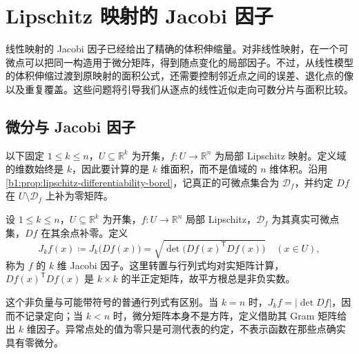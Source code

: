\section{Lipschitz 映射的 Jacobi 因子}
\label{b1:sec:1702}

线性映射的 Jacobi 因子已经给出了精确的体积伸缩量。对非线性映射，在一个可微点可以把同一构造用于微分矩阵，得到随点变化的局部因子。不过，从线性模型的体积伸缩过渡到原映射的面积公式，还需要控制邻近点之间的误差、退化点的像以及重复覆盖。这些问题将引导我们从逐点的线性近似走向可数分片与面积比较。


\subsection{微分与 Jacobi 因子}
\label{b1:subsec:170201}

以下固定 \(1\leq k\leq n\)，\(U\subseteq\mathbb R^k\) 为开集，\(f:U\to\mathbb R^n\) 为局部 Lipschitz 映射。定义域的维数始终是 \(k\)，因此要计算的是 \(k\) 维面积，而不是值域的 \(n\) 维体积。沿用\cref{b1:prop:lipschitz-differentiability-borel}，记真正的可微点集合为 \(\mathcal D_f\)，并约定 \(Df\) 在 \(U\setminus\mathcal D_f\) 上补为零矩阵。

\begin{definition}
\label{b1:def:lipschitz-jacobian}
设 \(1\le k\le n\)，\(U\subseteq\mathbb R^k\) 为开集，\(f:U\to\mathbb R^n\) 局部 Lipschitz，\(\mathcal D_f\) 为其真实可微点集，\(Df\) 在其余点补零。定义
\[
J_k f(x)\coloneqq J_k\bigl(Df(x)\bigr)
=\sqrt{\det\bigl(Df(x)^{\mathsf T}Df(x)\bigr)}
\quad(x\in U),
\]
称为 \(f\) 的 \(k\) 维 Jacobi 因子。这里转置与行列式均对实矩阵计算，\(Df(x)^{\mathsf T}Df(x)\) 是 \(k\times k\) 的半正定矩阵，故平方根总是非负实数。
\end{definition}

这个非负量与可能带符号的普通行列式有区别。当 \(k=n\) 时，\(J_k f=|\det Df|\)，因而不记录定向；当 \(k<n\) 时，微分矩阵本身不是方阵，定义借助其 Gram 矩阵给出 \(k\) 维因子。异常点处的值为零只是可测代表的约定，不表示函数在那些点确实具有零微分。

